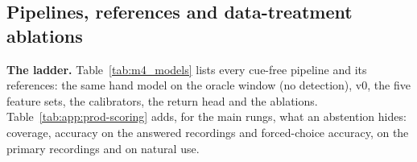 \subsection{Pipelines, references and data-treatment ablations}\label{app:prod:pipelines}

\textbf{The ladder.}
Table~\ref{tab:m4_models} lists every cue-free pipeline and its references: the same hand model on the oracle window (no detection), v0, the five feature sets, the calibrators, the return head and the ablations.
Table~\ref{tab:app:prod-scoring} adds, for the main rungs, what an abstention hides: coverage, accuracy on the answered recordings and forced-choice accuracy, on the primary recordings and on natural use.

